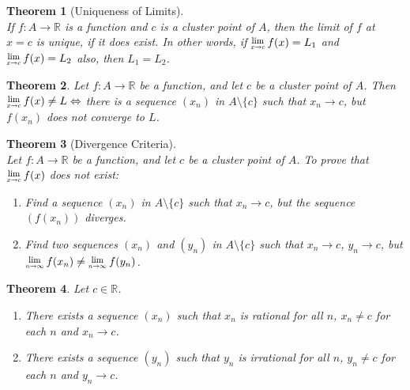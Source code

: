 \documentclass[8pt]{article}
\newcommand{\Lim}[1]{\raisebox{0.5ex}{\scalebox{0.8}{$\displaystyle \lim_{#1}\;$}}}
\newtheorem{theorem}{Theorem}[section]
\theoremstyle{definition}
\begin{document}
\begin{theorem}[Uniqueness of Limits]
\hfill\\\normalfont If $f:A\to\mathbb{R}$ is a function and $c$ is a cluster point of $A$, then the limit of $f$ at $x=c$ is unique, if it does exist. In other words, if $\Lim{x\to c}f(x)=L_1$ and $\Lim{x\to c}f(x)=L_2$ also, then $L_1 = L_2$.
\end{theorem}
\begin{theorem}\normalfont Let $f:A\to\mathbb{R}$ be a function, and let $c$ be a cluster point of $A$. Then $\Lim{x\to c}f(x)\neq L\Leftrightarrow$ there is a sequence $(x_n)$ in $A\setminus\{c\}$ such that $x_n\to c$, but $f(x_n)$ does not converge to $L$.
\end{theorem}
\begin{theorem}[Divergence Criteria]
\hfill\\\normalfont Let $f:A\to\mathbb{R}$ be a function, and let $c$ be a cluster point of $A$. To prove that $\Lim{x\to c}f(x)$ does not exist:
\begin{enumerate}[label = Method \arabic*]
\item Find a sequence $(x_n)$ in $A\setminus\{c\}$ such that $x_n\to c$, but the sequence $(f(x_n))$ diverges.
\item Find two sequences $(x_n)$ and $(y_n)$ in $A\setminus\{c\}$ such that $x_n\to c$, $y_n\to c$, but $\Lim{n\to\infty}f(x_n)\neq \Lim{n\to\infty} f(y_n)$.
\end{enumerate}
\end{theorem}
\begin{theorem}\normalfont Let $c\in\mathbb{R}$.
\begin{enumerate}
\item There exists a sequence $(x_n)$ such that $x_n$ is rational for all $n$, $x_n\neq c$ for each $n$ and $x_n\to c$.
\item There exists a sequence $(y_n)$ such that $y_n$ is irrational for all $n$, $y_n\neq c$ for each $n$ and $y_n\to c$.
\end{enumerate}
\end{theorem}
\end{document}
